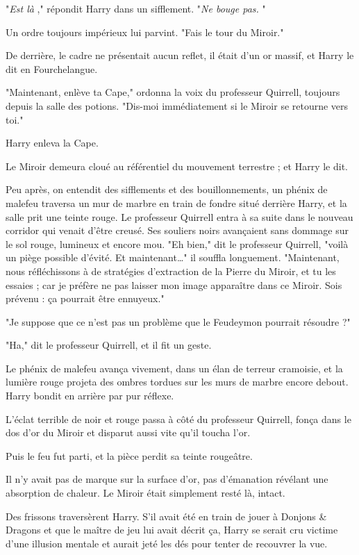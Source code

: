 "\emph{Est là} ," répondit Harry dans un sifflement. "\emph{Ne bouge pas.} "

Un ordre toujours impérieux lui parvint. "Fais le tour du Miroir."

De derrière, le cadre ne présentait aucun reflet, il était d'un or massif, et Harry le dit en Fourchelangue.

"Maintenant, enlève ta Cape," ordonna la voix du professeur Quirrell, toujours depuis la salle des potions. "Dis-moi immédiatement si le Miroir se retourne vers toi."

Harry enleva la Cape.

Le Miroir demeura cloué au référentiel du mouvement terrestre ; et Harry le dit.

Peu après, on entendit des sifflements et des bouillonnements, un phénix de malefeu traversa un mur de marbre en train de fondre situé derrière Harry, et la salle prit une teinte rouge. Le professeur Quirrell entra à sa suite dans le nouveau corridor qui venait d'être creusé. Ses souliers noirs avançaient sans dommage sur le sol rouge, lumineux et encore mou. "Eh bien," dit le professeur Quirrell, "voilà un piège possible d'évité. Et maintenant…" il souffla longuement. "Maintenant, nous réfléchissons à de stratégies d'extraction de la Pierre du Miroir, et tu les essaies ; car je préfère ne pas laisser mon image apparaître dans ce Miroir. Sois prévenu : ça pourrait être ennuyeux."

"Je suppose que ce n'est pas un problème que le Feudeymon pourrait résoudre ?"

"Ha," dit le professeur Quirrell, et il fit un geste.

Le phénix de malefeu avança vivement, dans un élan de terreur cramoisie, et la lumière rouge projeta des ombres tordues sur les murs de marbre encore debout. Harry bondit en arrière par pur réflexe.

L'éclat terrible de noir et rouge passa à côté du professeur Quirrell, fonça dans le dos d'or du Miroir et disparut aussi vite qu'il toucha l'or.

Puis le feu fut parti, et la pièce perdit sa teinte rougeâtre.

Il n'y avait pas de marque sur la surface d'or, pas d'émanation révélant une absorption de chaleur. Le Miroir était simplement resté là, intact.

Des frissons traversèrent Harry. S'il avait été en train de jouer à Donjons \& Dragons et que le maître de jeu lui avait décrit ça, Harry se serait cru victime d'une illusion mentale et aurait jeté les dés pour tenter de recouvrer la vue.

